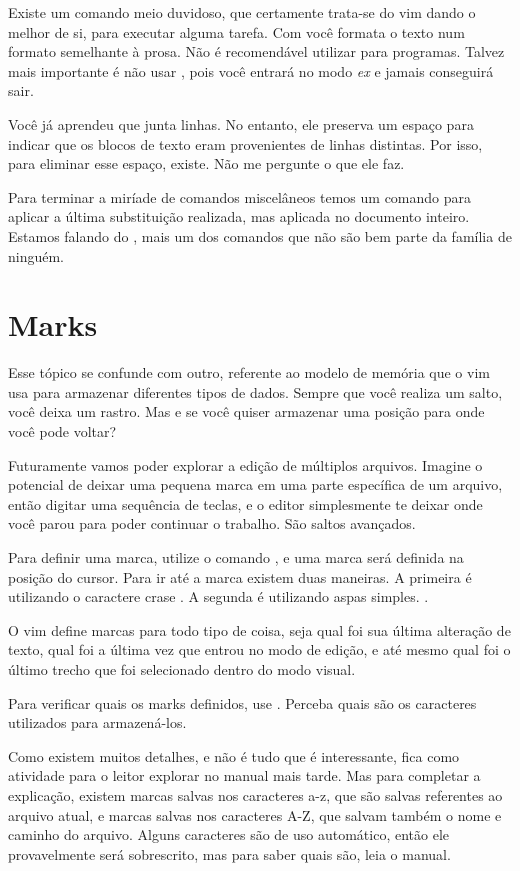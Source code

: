 Existe um comando meio duvidoso, que certamente trata-se do vim dando o melhor
de si, para executar alguma tarefa. Com  você formata o texto num formato
semelhante à prosa. Não é recomendável utilizar para programas.
Talvez mais importante é não usar , pois você entrará no modo \emph{ex} e jamais conseguirá sair.

Você já aprendeu que  junta linhas.
No entanto, ele preserva um espaço para indicar que os blocos de texto eram provenientes de linhas distintas.
Por isso, para eliminar esse espaço,  existe.
Não me pergunte o que ele faz.

Para terminar a miríade de comandos miscelâneos
temos um comando para aplicar a última substituição realizada, mas aplicada no documento inteiro.
Estamos falando do , mais um dos comandos que não são bem parte da família de ninguém.

\section{Marks}
Esse tópico se confunde com outro, referente ao modelo de memória que o vim usa para armazenar diferentes tipos de dados.
Sempre que você realiza um salto, você deixa um rastro.
Mas e se você quiser armazenar uma posição para onde você pode voltar?

Futuramente vamos poder explorar a edição de múltiplos arquivos.
Imagine o potencial de deixar uma pequena marca em uma parte específica de um arquivo,
então digitar uma sequência de teclas, e o editor simplesmente te deixar onde você parou para poder continuar o trabalho.
São saltos avançados.

Para definir uma marca, utilize o comando , e uma marca será definida na posição do cursor.
Para ir até a marca existem duas maneiras.
A primeira é utilizando o caractere crase \vimcommand{\`}.
A segunda é utilizando aspas simples. .

O vim define marcas para todo tipo de coisa, seja qual foi sua última alteração de texto,
qual foi a última vez que entrou no modo de edição,
e até mesmo qual foi o último trecho que foi selecionado dentro do modo visual.

Para verificar quais os marks definidos, use .
Perceba quais são os caracteres utilizados para armazená-los.

Como existem muitos detalhes, e não é tudo que é interessante, fica como atividade para o leitor explorar no manual mais tarde.
Mas para completar a explicação, existem marcas salvas nos caracteres a-z, 
que são salvas referentes ao arquivo atual, e marcas salvas nos caracteres A-Z,
que salvam também o nome e caminho do arquivo.
Alguns caracteres são de uso automático, então ele provavelmente será sobrescrito, mas para saber quais são, leia o manual.

